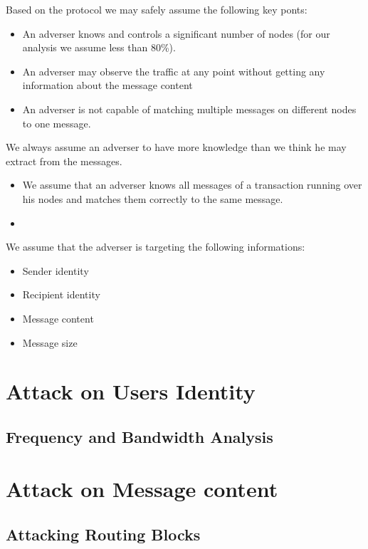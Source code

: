 Based on the protocol we may safely assume the following key ponts:
\begin{itemize}
	\item An adverser knows and controls a significant number of nodes (for our analysis we assume less than 80\%).
	\item An adverser may observe the traffic at any point without getting any information about the message content
	\item An adverser is not capable of matching multiple messages on different nodes to one message.
\end{itemize}

We always assume an adverser to have more knowledge than we think he may extract from the messages.
\begin{itemize}
	\item We assume that an adverser knows all messages of a transaction running over his nodes and matches them correctly to the same message.
	\item 
\end{itemize}

We assume that the adverser is targeting the following informations:
\begin{itemize}
	\item Sender identity
	\item Recipient identity
	\item Message content
	\item Message size
\end{itemize}

\section{Attack on Users Identity}

\subsection{Frequency and Bandwidth Analysis}

\section{Attack on Message content}

\subsection{Attacking Routing Blocks}

